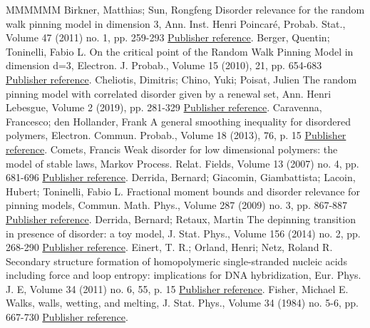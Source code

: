 \begin{thebibliography}{MMMMMM}
 Birkner, Matthias; Sun, Rongfeng Disorder relevance for the random walk pinning model in dimension 3, Ann. Inst. Henri Poincaré, Probab. Stat., Volume 47 (2011) no. 1, pp. 259-293 \href{https://ahl.centre-mersenne.org/item/AHL_2020__3__299_0/#cf:BS2}{Publisher reference}.
 Berger, Quentin; Toninelli, Fabio L. On the critical point of the Random Walk Pinning Model in dimension d=3, Electron. J. Probab., Volume 15 (2010), 21, pp. 654-683 \href{https://ahl.centre-mersenne.org/item/AHL_2020__3__299_0/#cf:BT10}{Publisher reference}.
 Cheliotis, Dimitris; Chino, Yuki; Poisat, Julien The random pinning model with correlated disorder given by a renewal set, Ann. Henri Lebesgue, Volume 2 (2019), pp. 281-329 \href{https://ahl.centre-mersenne.org/item/AHL_2020__3__299_0/#cf:CCP17}{Publisher reference}.
 Caravenna, Francesco; den Hollander, Frank A general smoothing inequality for disordered polymers, Electron. Commun. Probab., Volume 18 (2013), 76, p. 15 \href{https://ahl.centre-mersenne.org/item/AHL_2020__3__299_0/#cf:CH13}{Publisher reference}.
 Comets, Francis Weak disorder for low dimensional polymers: the model of stable laws, Markov Process. Relat. Fields, Volume 13 (2007) no. 4, pp. 681-696 \href{https://ahl.centre-mersenne.org/item/AHL_2020__3__299_0/#cf:Co07}{Publisher reference}.
 Derrida, Bernard; Giacomin, Giambattista; Lacoin, Hubert; Toninelli, Fabio L. Fractional moment bounds and disorder relevance for pinning models, Commun. Math. Phys., Volume 287 (2009) no. 3, pp. 867-887 \href{https://ahl.centre-mersenne.org/item/AHL_2020__3__299_0/#cf:DGLT09}{Publisher reference}.
 Derrida, Bernard; Retaux, Martin The depinning transition in presence of disorder: a toy model, J. Stat. Phys., Volume 156 (2014) no. 2, pp. 268-290 \href{https://ahl.centre-mersenne.org/item/AHL_2020__3__299_0/#cf:DR}{Publisher reference}.
 Einert, T. R.; Orland, Henri; Netz, Roland R. Secondary structure formation of homopolymeric single-stranded nucleic acids including force and loop entropy: implications for DNA hybridization, Eur. Phys. J. E, Volume 34 (2011) no. 6, 55, p. 15 \href{https://ahl.centre-mersenne.org/item/AHL_2020__3__299_0/#cf:EON11}{Publisher reference}.
 Fisher, Michael E. Walks, walls, wetting, and melting, J. Stat. Phys., Volume 34 (1984) no. 5-6, pp. 667-730 \href{https://ahl.centre-mersenne.org/item/AHL_2020__3__299_0/#cf:Fisher}{Publisher reference}.

\end{thebibliography}
